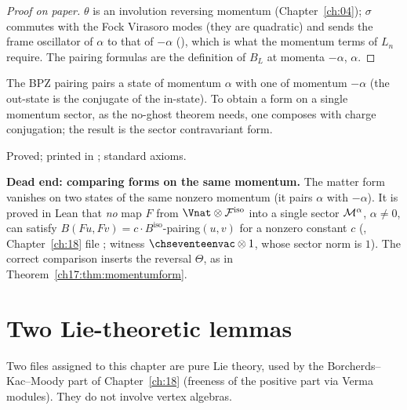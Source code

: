 \begin{proof}[Proof on paper]
$\theta$ is an involution reversing momentum (Chapter~\ref{ch:04}); $\sigma$ commutes with the Fock Virasoro modes (they are
quadratic) and sends the frame oscillator of $\alpha$ to that of $-\alpha$ (), which is what the
momentum terms of $L_n$ require.  The pairing formulas are the definition of $B_L$ at momenta $-\alpha$, $\alpha$.
\end{proof}

\begin{physics}
The BPZ pairing pairs a state of momentum $\alpha$ with one of momentum $-\alpha$ (the out-state is the conjugate of the in-state).
To obtain a form on a single momentum sector, as the no-ghost theorem needs, one composes with charge conjugation; the
result is the sector contravariant form.
\end{physics}

\begin{status}
Proved; printed in ; standard axioms.
\end{status}

\begin{warning}
\textbf{Dead end: comparing forms on the same momentum.}  The matter form vanishes on two states of the same nonzero
momentum (it pairs $\alpha$ with $-\alpha$).  It is proved in Lean that \emph{no} map $F$ from $\Vnat\otimes\chseventeenF^{\mathrm{iso}}$ into a
single sector $\mathcal{M}^\alpha$, $\alpha\neq0$, can satisfy $B(Fu,Fv)=c\cdot B^{\mathrm{iso}}$-pairing$(u,v)$ for a nonzero constant $c$
(, Chapter~\ref{ch:18} file
; witness $\chseventeenvac\otimes1$, whose sector norm is $1$).  The
correct comparison inserts the reversal $\Theta$, as in Theorem~\ref{ch17:thm:momentumform}.
\end{warning}

\section{Two Lie-theoretic lemmas}\label{ch17:sec:lie}

Two files assigned to this chapter are pure Lie theory, used by the Borcherds--Kac--Moody part of Chapter~\ref{ch:18}
(freeness of the positive part via Verma modules).  They do not involve vertex algebras.


